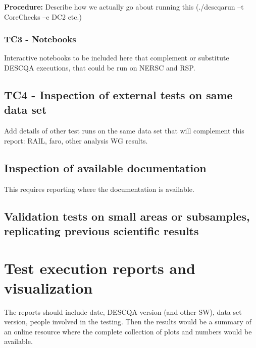 \documentclass[12pt, a4paper]{article}
\begin{document}
\textbf{Procedure:} Describe how we actually go about running this (./descqarun --t CoreChecks --c DC2 etc.)

\subsubsection{TC3 - Notebooks}
Interactive notebooks to be included here that complement or substitute DESCQA executions, that could be run on NERSC and RSP.

\subsection{TC4 - Inspection of external tests on same data set}
Add details of other test runs on the same data set that will complement this report: RAIL, faro, other analysis WG results.

\subsection{Inspection of available documentation}
This requires reporting where the documentation is available.

\subsection{Validation tests on small areas or subsamples, replicating previous scientific results}


\section{Test execution reports and visualization}

The reports should include date, DESCQA version (and other SW), data set version, people involved in the testing. Then the results would be a summary of an online resource where the complete collection of plots and numbers would be available.
\end{document}
